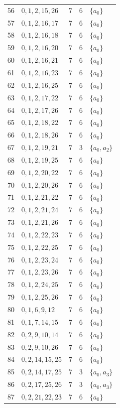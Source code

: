 \documentclass[10pt]{article}
\begin{document}
\begin{longtable}{@{}r l c c l@{}}
56 & $0,1,2,15,26$ & 7 & 6 & $\{a_{0}\}$\\
57 & $0,1,2,16,17$ & 7 & 6 & $\{a_{0}\}$\\
58 & $0,1,2,16,18$ & 7 & 6 & $\{a_{0}\}$\\
59 & $0,1,2,16,20$ & 7 & 6 & $\{a_{0}\}$\\
60 & $0,1,2,16,21$ & 7 & 6 & $\{a_{0}\}$\\
61 & $0,1,2,16,23$ & 7 & 6 & $\{a_{0}\}$\\
62 & $0,1,2,16,25$ & 7 & 6 & $\{a_{0}\}$\\
63 & $0,1,2,17,22$ & 7 & 6 & $\{a_{0}\}$\\
64 & $0,1,2,17,26$ & 7 & 6 & $\{a_{0}\}$\\
65 & $0,1,2,18,22$ & 7 & 6 & $\{a_{0}\}$\\
66 & $0,1,2,18,26$ & 7 & 6 & $\{a_{0}\}$\\
67 & $0,1,2,19,21$ & 7 & 3 & $\{a_{0},a_{2}\}$\\
68 & $0,1,2,19,25$ & 7 & 6 & $\{a_{0}\}$\\
69 & $0,1,2,20,22$ & 7 & 6 & $\{a_{0}\}$\\
70 & $0,1,2,20,26$ & 7 & 6 & $\{a_{0}\}$\\
71 & $0,1,2,21,22$ & 7 & 6 & $\{a_{0}\}$\\
72 & $0,1,2,21,24$ & 7 & 6 & $\{a_{0}\}$\\
73 & $0,1,2,21,26$ & 7 & 6 & $\{a_{0}\}$\\
74 & $0,1,2,22,23$ & 7 & 6 & $\{a_{0}\}$\\
75 & $0,1,2,22,25$ & 7 & 6 & $\{a_{0}\}$\\
76 & $0,1,2,23,24$ & 7 & 6 & $\{a_{0}\}$\\
77 & $0,1,2,23,26$ & 7 & 6 & $\{a_{0}\}$\\
78 & $0,1,2,24,25$ & 7 & 6 & $\{a_{0}\}$\\
79 & $0,1,2,25,26$ & 7 & 6 & $\{a_{0}\}$\\
80 & $0,1,6,9,12$ & 7 & 6 & $\{a_{0}\}$\\
81 & $0,1,7,14,15$ & 7 & 6 & $\{a_{0}\}$\\
82 & $0,2,9,10,14$ & 7 & 6 & $\{a_{0}\}$\\
83 & $0,2,9,10,26$ & 7 & 6 & $\{a_{0}\}$\\
84 & $0,2,14,15,25$ & 7 & 6 & $\{a_{0}\}$\\
85 & $0,2,14,17,25$ & 7 & 3 & $\{a_{0},a_{3}\}$\\
86 & $0,2,17,25,26$ & 7 & 3 & $\{a_{0},a_{3}\}$\\
87 & $0,2,21,22,23$ & 7 & 6 & $\{a_{0}\}$\\

\end{longtable}
\end{document}
